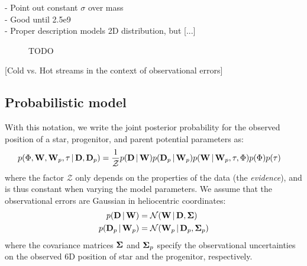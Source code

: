 \documentclass[letterpaper,12pt,preprint]{aastex}
\newcommand{\given}{\,|\,}
\newcommand{\D}{{\bf D}}
\newcommand{\W}{{\bf W}}
\newcommand{\bSigma}{{\bf \Sigma}}
\newcommand{\rtide}{r_{\rm tide}}
\newcommand{\bs}{\boldsymbol}
\begin{document}
- Point out constant $\sigma$ over mass\\
- Good until 2.5e9\\
- Proper description models 2D distribution, but [...]


\begin{figure}[h]
\begin{center}
\caption{ TODO }\label{fig:reldist}
\end{center}
\end{figure}


[Cold vs. Hot streams in the context of observational errors]

\subsection{Probabilistic model}
With this notation, we write the joint posterior probability for the observed position of a star, progenitor, and parent potential parameters as:
\begin{align}
	p(\Phi, \W, \W_p, \tau \given \D, \D_p) &= \frac{1}{\mathcal{Z}} p(\D \given \W) p(\D_p \given \W_p) 
												       p(\W \given \W_p, \tau, \Phi) 
												       p(\Phi) p(\tau)
\end{align}
where the factor $\mathcal{Z}$ only depends on the properties of the data (the \emph{evidence}), and is thus constant when varying the model parameters. We assume that the observational errors are Gaussian in heliocentric coordinates:
\begin{align}
	p(\D \given \W) &= \mathcal{N}(\W \given \D, \bSigma)\\
	p(\D_p \given \W_p) &= \mathcal{N}(\W_p \given \D_p, \bSigma_p)
\end{align}
where the covariance matrices $\bSigma$ and $\bSigma_p$ specify the observational uncertainties on the observed 6D position of star and the progenitor, respectively. 
\end{document}
